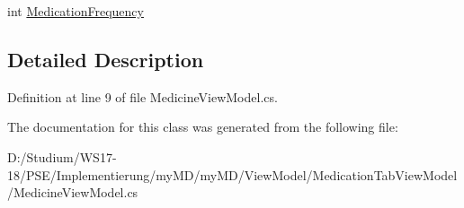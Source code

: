 \begin{CompactItemize}
\item 
\hypertarget{classmy_m_d_1_1_view_model_1_1_medication_tab_view_model_1_1_medicine_view_model_be4b821070ff9dd924e8ccc805d38729}{
int \hyperlink{classmy_m_d_1_1_view_model_1_1_medication_tab_view_model_1_1_medicine_view_model_be4b821070ff9dd924e8ccc805d38729}{Medication\-Frequency}}
\label{d0/d4a/classmy_m_d_1_1_view_model_1_1_medication_tab_view_model_1_1_medicine_view_model_be4b821070ff9dd924e8ccc805d38729}

\end{CompactItemize}


\subsection{Detailed Description}




Definition at line 9 of file Medicine\-View\-Model.cs.

The documentation for this class was generated from the following file:\begin{CompactItemize}
\item 
D:/Studium/WS17-18/PSE/Implementierung/my\-MD/my\-MD/View\-Model/Medication\-Tab\-View\-Model/Medicine\-View\-Model.cs\end{CompactItemize}
